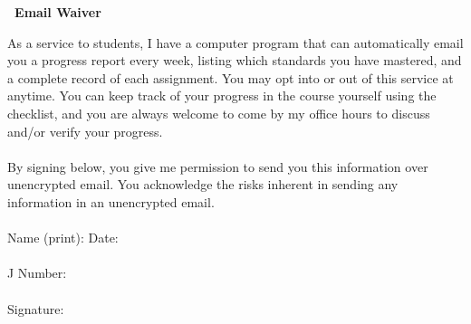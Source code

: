 \documentclass{article}
\begin{document}
\begin{center}
\large \bf \course\ Email Waiver
\end{center}

As a service to students, I have a computer program that can automatically email you a progress report every week, listing which standards you have mastered, and a complete record of each assignment.  You may opt into or out of this service at anytime.  You can keep track of your progress in the course yourself using the checklist, and you are always welcome to come by my office hours to discuss and/or verify your progress. \\

\ \\
By signing below, you give me permission to send you this information over unencrypted email.  You acknowledge the risks inherent in sending any information in an unencrypted email.\\
\ \\


\noindent Name (print): \underline{\phantom{XXXXXXXXXXXXXXXXXXXXXXXXXXXXXXXXX}} \hfill Date: \underline{\phantom{XXXXXXXXXXXXXXX}} \\
\ \\
\noindent J Number: \underline{\phantom{XXXXXXXXXXXXXXXXXXXXXXXXXXXXXXXX}} \\
\ \\
\noindent Signature:  \underline{\phantom{XXXXXXXXXXXXXXXXXXXXXXXXXXXXXXXXXXXXXXXXXXXXXXXXXX}}
\end{document}
